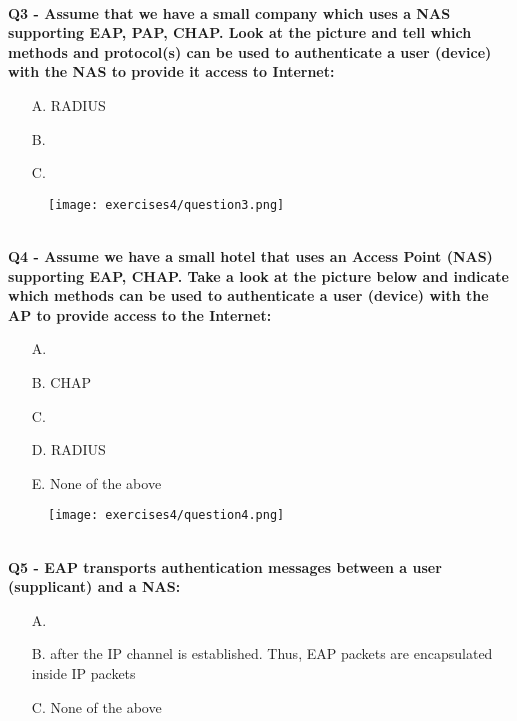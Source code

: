 \textbf{\\Q3 - Assume that we have a small company which uses a NAS supporting EAP, PAP, CHAP. Look at the picture and tell which methods and protocol(s) can be used to authenticate a user (device) with the NAS to provide it access to Internet:}
\begin{itemize}
    \item[A.] RADIUS
    \item[B.] 
    \item[C.] 
\end{itemize}
\begin{figure}[h]
    \centering
    \texttt{[image: exercises4/question3.png]}
\end{figure}

\textbf{\\Q4 - Assume we have a small hotel that uses an Access Point (NAS) supporting EAP, CHAP. Take a look at the picture below and indicate which methods can be used to authenticate a user (device) with the AP to provide access to the Internet:}
\begin{itemize}
    \item[A.] 
    \item[B.] CHAP
    \item[C.] 
    \item[D.] RADIUS
    \item[E.] None of the above
\end{itemize}
\begin{figure}[h]
    \centering
    \texttt{[image: exercises4/question4.png]}
\end{figure}

\textbf{\\Q5 - EAP transports authentication messages between a user (supplicant) and a NAS:}
\begin{itemize}
    \item[A.] 
    \item[B.] after the IP channel is established. Thus, EAP packets are encapsulated inside IP packets
    \item[C.] None of the above
\end{itemize}

